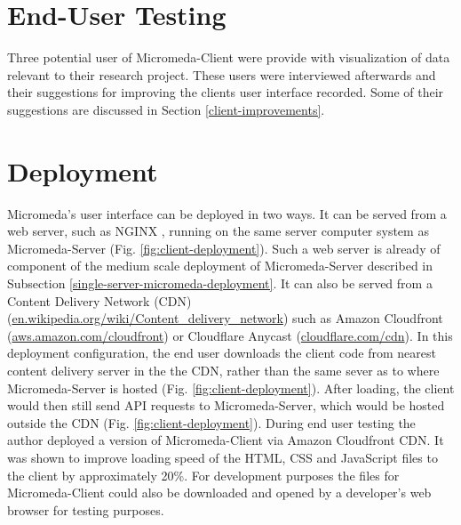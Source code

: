 \section{End-User Testing}

Three potential user of Micromeda-Client were provide with visualization of data relevant to their research project. These users were interviewed afterwards and their suggestions for improving the clients user interface recorded. Some of their suggestions are discussed in Section \ref{client-improvements}. 

\section{Deployment}

Micromeda's user interface can be deployed in two ways. It can be served from a web server, such as NGINX \cite{reese2008nginx}, running on the same server computer system as Micromeda-Server (Fig. \ref{fig:client-deployment}). Such a web server is already of component of the medium scale deployment of Micromeda-Server described in Subsection \ref{single-server-micromeda-deployment}. It can also be served from a Content Delivery Network (CDN) \cite{farber2003internet} (\href{en.wikipedia.org/wiki/Content\_delivery\_network}{en.wikipedia.org/wiki/Content\_delivery\_network}) such as Amazon Cloudfront \cite{varia2014overview} (\href{aws.amazon.com/cloudfront}{aws.amazon.com/cloudfront}) or Cloudflare Anycast \cite{calder2015analyzing} (\href{cloudflare.com/cdn}{cloudflare.com/cdn}). In this deployment configuration, the end user downloads the client code from nearest content delivery server in the the CDN, rather than the same sever as to where Micromeda-Server is hosted (Fig. \ref{fig:client-deployment}). After loading, the client would then still send API requests to Micromeda-Server, which would be hosted outside the CDN (Fig. \ref{fig:client-deployment}). During end user testing the author deployed a version of Micromeda-Client via Amazon Cloudfront CDN. It was shown to improve loading speed of the HTML, CSS and JavaScript files to the client by approximately 20\%. For development purposes the files for Micromeda-Client could also be downloaded and opened by a developer's web browser for testing purposes.

